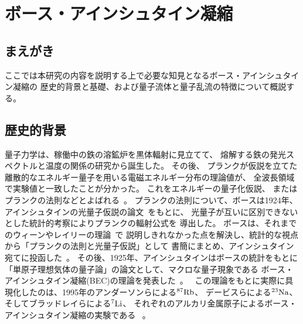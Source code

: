 \documentclass[12pt,a4paper]{jbook}
\begin{document}
	\pagestyle{fancy}
	\lhead{\leftmark}
	\chead{}
	\rhead{\thepage}
	\cfoot{}
	\tableofcontents
	\setcounter{page}{1}
    \listoffigures %
	\newpage
	\normalsize

	\chapter{ボース・アインシュタイン凝縮}
		\section{まえがき}
		ここでは本研究の内容を説明する上で必要な知見となるボース・アインシュタイン凝縮の
        歴史的背景と基礎、および量子流体と量子乱流の特徴について概説する。


		\section{歴史的背景}
		量子力学は、稼働中の鉄の溶鉱炉を黒体輻射に見立てて、
        熔解する鉄の発光スペクトルと温度の関係の研究から誕生した。
        その後、
        プランクが仮説を立てた離散的なエネルギー量子を用いる電磁エネルギー分布の理論値が、
        全波長領域で実験値と一致したことが分かった。
        これをエネルギーの量子化仮説、
        またはプランクの法則などとよばれる~\cite{Planck}。
		プランクの法則について、ボースは1924年、アインシュタインの光量子仮説の論文~\cite{A.Einstein1}をもとに、
		光量子が互いに区別できないとした統計的考察によりプランクの輻射公式を
		導出した。
        ボースは、それまでのウィーンやレイリーの理論~\cite{Wien, Rayleigh}で
		説明しきれなかった点を解決し、統計的な視点から「プランクの法則と光量子仮説」として
		書簡にまとめ、アインシュタイン宛てに投函した~\cite{S.N.Bose}。
		その後、1925年、アインシュタインはボースの統計をもとに
		「単原子理想気体の量子論」の論文として、マクロな量子現象である
		ボース・アインシュタイン凝縮(BEC)の理論を発表した~\cite{A.Einstein2}。
		\ この理論をもとに実際に具現化したのは、1995年のアンダーソンらによる${\rm ^{87}Rb}$、
        デービスらによる${\rm ^{23}Na}$、そしてブラッドレイらによる${\rm ^{7}Li}$、
        それぞれのアルカリ金属原子によるボース・アインシュタイン凝縮の実験である
		~\cite{Anderson,Davis, CCBradley, E.Cornel}。
\end{document}
